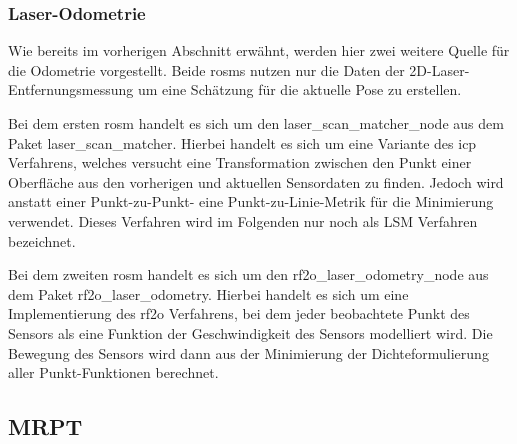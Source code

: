 %
%
\subsubsection{Laser-Odometrie}

Wie bereits im vorherigen Abschnitt erwähnt, werden hier zwei weitere Quelle für die Odometrie vorgestellt. Beide \Glspl{rosm} nutzen nur die Daten der 2D-Laser-Entfernungsmessung um eine Schätzung für die aktuelle Pose zu erstellen.

Bei dem ersten \gls{rosm} handelt es sich um den laser\_scan\_matcher\_node aus dem Paket laser\_scan\_matcher. Hierbei handelt es sich um eine Variante des \gls{icp} Verfahrens, welches versucht eine Transformation zwischen den Punkt einer Oberfläche aus den vorherigen und aktuellen Sensordaten zu finden. Jedoch wird anstatt einer Punkt-zu-Punkt- eine Punkt-zu-Linie-Metrik für die Minimierung verwendet. \cite{censi2008icp} Dieses Verfahren wird im Folgenden nur noch als LSM Verfahren bezeichnet.

Bei dem zweiten \gls{rosm} handelt es sich um den rf2o\_laser\_odometry\_node aus dem Paket rf2o\_laser\_odometry. Hierbei handelt es sich um eine Implementierung des \gls{rf2o} Verfahrens, bei dem jeder beobachtete Punkt des Sensors als eine Funktion der Geschwindigkeit des Sensors modelliert wird. Die Bewegung des Sensors wird dann aus der Minimierung der Dichteformulierung aller Punkt-Funktionen berechnet. \cite{jaimez2016planar}


%
%
\subsection{MRPT}


